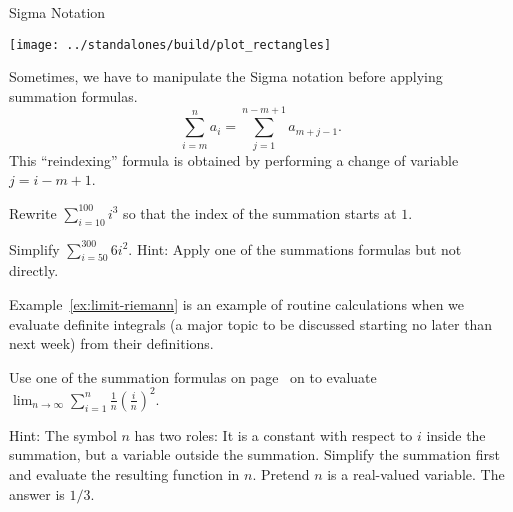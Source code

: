 \documentclass[../main.tex]{subfiles}
\begin{document}
\begin{lesson}{Sigma Notation}
\begin{example}
    \begin{center}
      \texttt{[image: ../standalones/build/plot\_rectangles]}
    \end{center}
  \end{example}
  \clearpage

  Sometimes, we have to manipulate the Sigma notation before applying summation formulas.
  \begin{equation} \label{eq:summation-reindex}
    \sum_{i=m}^{n} a_{i} = \sum_{j = 1}^{n - m + 1} a_{m+j-1}.
  \end{equation}
  This ``reindexing'' formula is obtained by performing a change of variable \(j = i - m + 1\).
  \begin{example}
    Rewrite \(\sum_{i=10}^{100} i^{3}\) so that the index of the summation starts at \(1\).
  \end{example}

  \begin{example} 
    Simplify \(\sum_{i=50}^{300} 6 i^{2}\).  {\footnotesize Hint: Apply one of the summations formulas but not directly.}
  \end{example}
  \clearpage

  Example~\ref{ex:limit-riemann} is an example of routine calculations when we evaluate definite integrals (a major topic to be discussed starting no later than next week) from their definitions.
  \begin{example} \label{ex:limit-riemann}
    Use one of the summation formulas on page~\pageref{formula:summations} on to evaluate \(\lim_{n \to \infty} \sum_{i=1}^{n} \frac{1}{n} \left( \frac{i}{n} \right)^{2}\).  

    {\footnotesize Hint: The symbol \(n\) has two roles: It is a constant with respect to \(i\) inside the summation, but a variable outside the summation. Simplify the summation first and evaluate the resulting function in \(n\). Pretend \(n\) is a real-valued variable. The answer is \(1/3\).}
  \end{example}

\end{lesson}
\end{document}
